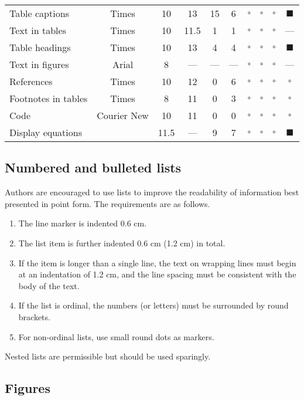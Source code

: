 \documentclass{ledger}
\begin{document}
\begin{table}[ht]
\begin{tabularx}{\textwidth}{ l  c  c  C  C  C  c  c  c  c }
Table captions & Times & 10 & 13 & 15 & 6 & $\square$ & $\square$ & $\square$ & $\blacksquare$ \\
Text in tables & Times & 10 & 11.5 & 1 & 1 & $\square$ & $\square$ & $\square$ & --- \\
Table headings & Times & 10 & 13 & 4 & 4 & $\square$ & $\square$ & $\square$ & $\blacksquare$ \\
Text in figures & Arial & 8 & --- & --- & --- & $\square$ & $\square$ & $\square$ & --- \\
References & Times & 10 & 12 & 0 & 6 & $\square$ & $\square$ & $\square$ & $\square$  \\
Footnotes in tables & Times & 8 & 11 & 0 & 3 & $\square$ & $\square$ & $\square$ & $\square$ \\
Code & Courier New & 10 & 11 & 0 & 0 & $\square$ & $\square$ & $\square$ & $\square$ \\
Display equations &  & 11.5 & --- & 9 & 7 & $\square$ & $\square$ & $\square$ & $\blacksquare$ \\ \hline
\end{tabularx}
\end{table}

\subsection{Numbered and bulleted lists}

Authors are encouraged to use lists to improve the readability of information best presented in point form.  The requirements are as follows.
\begin{enumerate}
\item The line marker is indented 0.6 cm.
\item The list item is further indented 0.6 cm (1.2 cm) in total.
\item If the item is longer than a single line, the text on wrapping lines must begin at an indentation of 1.2 cm, and the line spacing must be consistent with the body of the text.
\item If the list is ordinal, the numbers (or letters) must be surrounded by round brackets.
\item For non-ordinal lists, use small round dots as markers.
\end{enumerate}
Nested lists are permissible but should be used sparingly.

\subsection{Figures}
\end{document}
